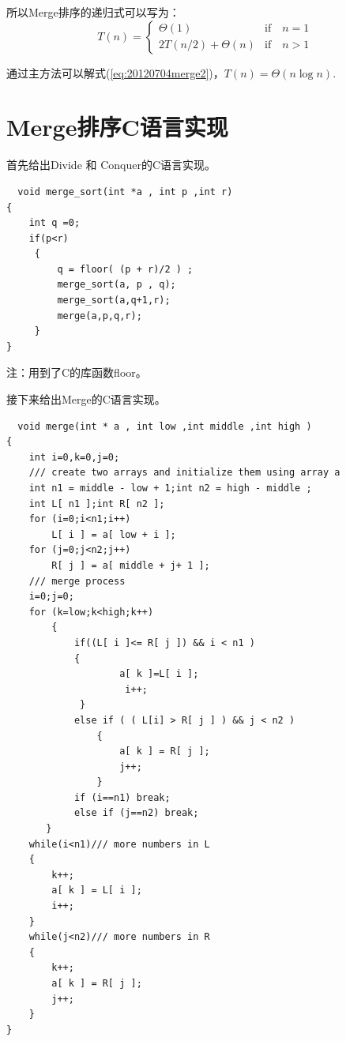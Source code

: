 \documentclass[10pt,a4paper,UTF8]{article}
\begin{document}
所以Merge排序的递归式可以写为：
\begin{equation}
  \label{eq:20120704merge2}
  T(n) = \left \{
  \begin{array}{ll}
    \Theta(1) &  \text{if} \quad n=1 \\
    2T(n/2) + \Theta(n) & \text{if} \quad n>1
  \end{array} \right.
\end{equation}

通过主方法可以解式(\ref{eq:20120704merge2})，\(T(n)=\Theta(n\log{n})\).
\section{Merge排序C语言实现}
\label{sec:org70d2fe7}



首先给出Divide 和 Conquer的C语言实现。

\lstset{language=C,label= ,caption= ,captionpos=b,firstnumber=1,numbers=left}
\begin{lstlisting}
  void merge_sort(int *a , int p ,int r)
{
    int q =0;
    if(p<r)
     {
         q = floor( (p + r)/2 ) ;
         merge_sort(a, p , q);
         merge_sort(a,q+1,r);
         merge(a,p,q,r);
     }
}
\end{lstlisting}

注：用到了C的库函数floor。

接下来给出Merge的C语言实现。

\lstset{language=C,label= ,caption= ,captionpos=b,firstnumber=1,numbers=left}
\begin{lstlisting}
  void merge(int * a , int low ,int middle ,int high )
{
    int i=0,k=0,j=0;
    /// create two arrays and initialize them using array a
    int n1 = middle - low + 1;int n2 = high - middle ;
    int L[ n1 ];int R[ n2 ];
    for (i=0;i<n1;i++)
        L[ i ] = a[ low + i ];
    for (j=0;j<n2;j++)
        R[ j ] = a[ middle + j+ 1 ];
    /// merge process
    i=0;j=0;
    for (k=low;k<high;k++)
        {
            if((L[ i ]<= R[ j ]) && i < n1 )
            {
                    a[ k ]=L[ i ];
                     i++;
             }
            else if ( ( L[i] > R[ j ] ) && j < n2 )
                {
                    a[ k ] = R[ j ];
                    j++;
                }
            if (i==n1) break;
            else if (j==n2) break;
       }
    while(i<n1)/// more numbers in L
    {
        k++;
        a[ k ] = L[ i ];
        i++;
    }
    while(j<n2)/// more numbers in R
    {
        k++;
        a[ k ] = R[ j ];
        j++;
    }
}
\end{lstlisting}
\end{document}
